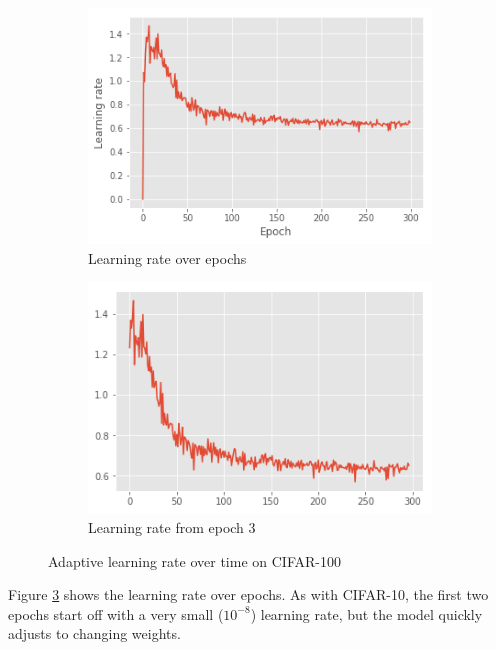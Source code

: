 \documentclass{article}
\begin{document}
\begin{figure}
    \centering
    \begin{subfigure}[b]{0.4\textwidth}
        \includegraphics[width=\linewidth]{cifar100-lr-full.png}
        \caption{Learning rate over epochs}
        \label{fig:cifar100:1a}
    \end{subfigure}
    \begin{subfigure}[b]{0.4\textwidth}
        \includegraphics[width=\linewidth]{cifar100-lr-3.png}
        \caption{Learning rate from epoch 3}
        \label{fig:cifar100:1b}
    \end{subfigure}
    \caption{Adaptive learning rate over time on CIFAR-100}
    \label{fig:cifar100:1}
\end{figure}

Figure \ref{fig:cifar100:1} shows the learning rate over epochs. As with CIFAR-10, the first two epochs start off with a very small ($10^{-8}$) learning rate, but the model quickly adjusts to changing weights.
\end{document}
